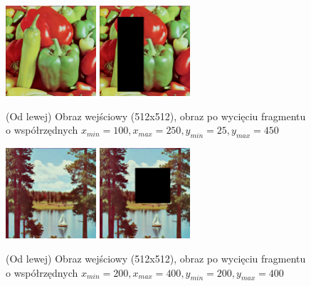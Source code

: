 \documentclass[final,a4paper,openany,12pt]{mwbk}
\begin{document}
\begin{figure}[H]
	\begin{center}
		\includegraphics[width=0.3\textwidth]{1/1Geo_Cut_Original}
		\includegraphics[width=0.3\textwidth]{1/1Geo_Cut_Result}
	\end{center}
	\caption{(Od lewej) Obraz wejściowy (512x512), obraz po wycięciu fragmentu o współrzędnych $x_{min}=100, x_{max}=250, y_{min}=25, y_{max}=450$ }
\end{figure}

\begin{figure}[H]
	\begin{center}
		\includegraphics[width=0.3\textwidth]{2/2Geo_Cut_Original}
		\includegraphics[width=0.3\textwidth]{2/2Geo_Cut_Result}
	\end{center}
	\caption{(Od lewej) Obraz wejściowy (512x512), obraz po wycięciu fragmentu o współrzędnych $x_{min}=200, x_{max}=400, y_{min}=200, y_{max}=400$ }
\end{figure}
\end{document}
